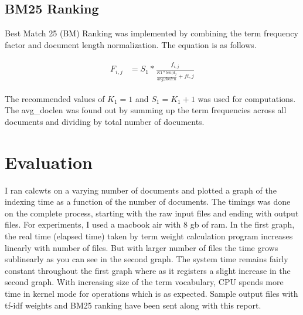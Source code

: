 \documentclass[paper=a4, fontsize=11pt]{scrartcl}
\numberwithin{equation}{section}		%
\numberwithin{figure}{section}			%
\numberwithin{table}{section}				%
\begin{document}
\subsection{BM25 Ranking}

Best Match 25 (BM) Ranking was implemented by combining the term frequency factor and document length normalization. The equation is as follows.

\begin{align} 
	\begin{split}
	F_{i, j} 	&= S_{1} * \frac{f_{i,j}}{\frac{K1 * len(d_{j}}{avg\_doclen} + f{i,j}}
	\end{split}					
\end{align} 

The recommended values of $K_{1} = 1$ and $S_{1} = K_{1} + 1$ was used for computations. The avg\_doclen was found out by summing up the term frequencies across all documents and dividing by total number of documents.

\section{Evaluation}

I ran calcwts on a varying number of documents and plotted a graph of the indexing time as a function of the number of documents. The timings was done on the complete process, starting with the raw input files and ending with output files. For experiments, I used a macbook air with 8 gb of ram. In the first graph, the real time (elapsed time) taken by term weight calculation program increases linearly with number of files. But with larger number of files the time grows sublinearly as you can see in the second graph. The system time remains fairly constant throughout the first graph where as it registers a slight increase in the second graph. With increasing size of the term vocabulary, CPU spends more time in kernel mode for operations which is as expected. Sample output files with tf-idf weights and BM25 ranking have been sent along with this report. 


\end{document}

